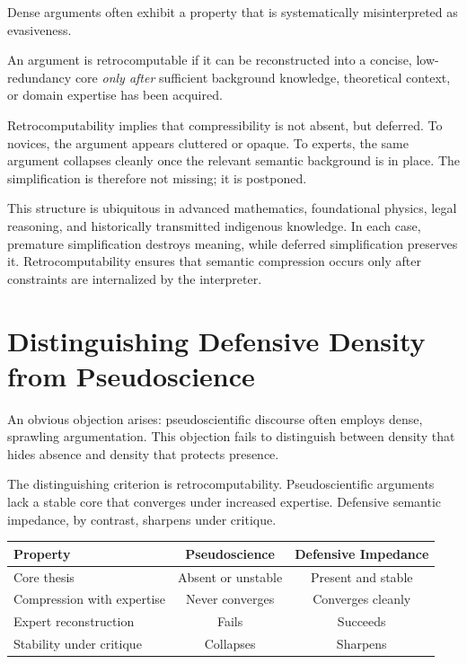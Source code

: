 Dense arguments often exhibit a property that is systematically misinterpreted as evasiveness.

\begin{definition}[Retrocomputability]
An argument is retrocomputable if it can be reconstructed into a concise, low-redundancy core \emph{only after} sufficient background knowledge, theoretical context, or domain expertise has been acquired.
\end{definition}

Retrocomputability implies that compressibility is not absent, but deferred. To novices, the argument appears cluttered or opaque. To experts, the same argument collapses cleanly once the relevant semantic background is in place. The simplification is therefore not missing; it is postponed.

This structure is ubiquitous in advanced mathematics, foundational physics, legal reasoning, and historically transmitted indigenous knowledge. In each case, premature simplification destroys meaning, while deferred simplification preserves it. Retrocomputability ensures that semantic compression occurs only after constraints are internalized by the interpreter.

\section{Distinguishing Defensive Density from Pseudoscience}
\label{sec:pseudo}

An obvious objection arises: pseudoscientific discourse often employs dense, sprawling argumentation. This objection fails to distinguish between density that hides absence and density that protects presence.

The distinguishing criterion is retrocomputability. Pseudoscientific arguments lack a stable core that converges under increased expertise. Defensive semantic impedance, by contrast, sharpens under critique.

\begin{center}
\begin{tabular}{lcc}
\textbf{Property} & \textbf{Pseudoscience} & \textbf{Defensive Impedance} \\
\hline
Core thesis & Absent or unstable & Present and stable \\
Compression with expertise & Never converges & Converges cleanly \\
Expert reconstruction & Fails & Succeeds \\
Stability under critique & Collapses & Sharpens \\
\end{tabular}
\end{center}

